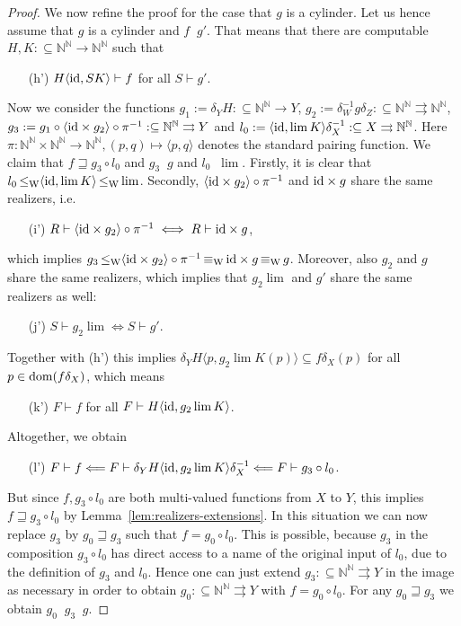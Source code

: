 \documentclass[a4paper]{amsart}
\def\IN{{\mathbb{N}}}
\def\In{\subseteq}
\def\mto{\rightrightarrows}
\def\id{{\rm id}}
\def\dom{{\rm dom}}
\def\Baire{{\IN^\IN}}
\def\leqW{\mathop{\leq_{\mathrm{W}}}}
\def\equivW{\mathop{\equiv_{\mathrm{W}}}}
\theoremstyle{definition}
\begin{document}
\begin{proof}
We now refine the proof for the case that $g$ is a cylinder.
Let us hence assume that $g$ is a cylinder and $f\leqW g'$.
That means that there are computable $H,K:\In\Baire\to\Baire$ such that 
\begin{enumerate}
\item[(h')] $H\langle\id,SK\rangle\vdash f$ for all $S\vdash g'$.
\end{enumerate}
Now we consider the functions $g_1:=\delta_YH:\In\Baire\to Y$, $g_2:=\delta_W^{-1}g\delta_Z:\In\Baire\mto\Baire$,
$g_3:=g_1\circ\langle\id\times g_2\rangle\circ\pi^{-1}:\In\Baire\mto Y$ and $l_0:=\langle\id,\lim K\rangle\delta_X^{-1}:\In X\mto\Baire$. 
Here $\pi:\Baire\times\Baire\to\Baire,(p,q)\mapsto\langle p,q\rangle$ denotes the standard pairing function.
We claim that $f\sqsupseteq g_3\circ l_0$ and $g_3\leqW g$ and $l_0\leqW\lim$. 
Firstly, it is clear that $l_0\leqW\langle\id,\lim K\rangle\leqW\lim$.
Secondly, $\langle\id\times g_2\rangle\circ\pi^{-1}$ and $\id\times g$ share the same realizers, i.e.\
\begin{enumerate}
\item[(i')] $R\vdash \langle\id\times g_2\rangle\circ\pi^{-1}\iff R\vdash \id\times g$,
\end{enumerate}
which implies $g_3\leqW\langle\id\times g_2\rangle\circ\pi^{-1}\equivW \id\times g\equivW g$. 
Moreover, also $g_2$ and $g$ share the same realizers, which implies
that $g_2\lim$ and $g'$ share the same realizers as well:
\begin{enumerate}
\item[(j')] $S\vdash g_2\lim\iff S\vdash g'$.
\end{enumerate}
Together with (h') this implies $\delta_YH\langle p,g_2\lim K(p)\rangle\In f\delta_X(p)$ for all $p\in\dom(f\delta_X)$, which means
\begin{enumerate}
\item[(k')]  $F\vdash f$ for all $F\vdash H\langle\id, g_2\lim K\rangle$.
\end{enumerate}
Altogether, we obtain
\begin{enumerate}
\item[(l')] $F\vdash f\Longleftarrow F\vdash\delta_YH\langle\id, g_2\lim K\rangle\delta_X^{-1}\Longleftarrow F\vdash g_3\circ l_0$.
\end{enumerate}
But since $f,g_3\circ l_0$ are both multi-valued functions from $X$ to $Y$, this implies
$f\sqsupseteq g_3\circ l_0$ by Lemma~\ref{lem:realizers-extensions}.
In this situation we can now replace $g_3$ by $g_0\sqsupseteq g_3$ such that $f=g_0\circ l_0$. This is
possible, because $g_3$ in the composition $g_3\circ l_0$ has direct access to a name of the original input of $l_0$,
due to the definition of $g_3$ and $l_0$. 
Hence one can just extend $g_3:\In\IN^\IN\mto Y$ in the image as necessary in order to obtain $g_0:\In\IN^\IN\mto Y$ with $f=g_0\circ l_0$.
For any $g_0\sqsupseteq g_3$ we obtain $g_0\leqW g_3\leqW g$.
\end{proof}
\end{document}
